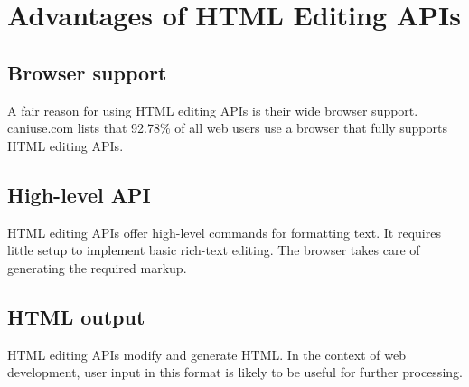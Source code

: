 
\section{Advantages of HTML Editing APIs}
\label{sec:edit_api_adv}


\subsection{Browser support}

A fair reason for using HTML editing APIs is their wide browser support. caniuse.com lists that 92.78\% of all web users use a browser that fully supports HTML editing APIs\cite{caniuse_contenteditable}.



\subsection{High-level API}

HTML editing APIs offer high-level commands for formatting text. It requires little setup to implement basic rich-text editing. The browser takes care of generating the required markup.

\subsection{HTML output}

HTML editing APIs modify and generate HTML. In the context of web development, user input in this format is likely to be useful for further processing.



